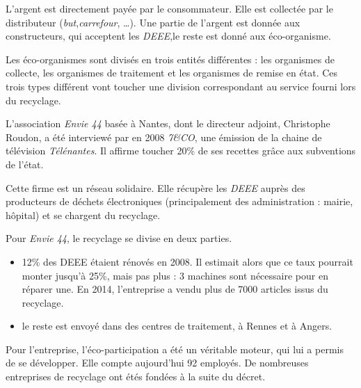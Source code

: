 L'argent est directement payée par le consommateur. Elle est collectée par le distributeur (\textit{but},\textit{carrefour}, \dots). Une partie de l'argent est donnée aux constructeurs, qui acceptent les \textit{DEEE},le reste est donné aux éco-organisme. 

Les éco-organismes sont divisés en trois entités différentes : les organismes de collecte, les organismes de traitement et les organismes de remise en état. Ces trois types différent vont toucher une division correspondant au service fourni lors du recyclage. 

\medbreak

L'association \textit{Envie 44} basée à Nantes, dont le directeur adjoint, Christophe Roudon, a été interviewé par en 2008 \textit{7\&CO}, une émission de la chaine de télévision \textit{Télénantes}. Il affirme toucher 20\% de ses recettes grâce aux subventions de l'état. 

Cette firme est un réseau solidaire. Elle récupère les \textit{DEEE} auprès des producteurs de déchets électroniques (principalement des administration : mairie, hôpital) et se chargent du recyclage. 

Pour \textit{Envie 44}, le recyclage se divise en deux parties. 
\begin{itemize}
\item 12\% des DEEE étaient rénovés en 2008. Il estimait alors que ce taux pourrait monter jusqu'à 25\%, mais pas plus : 3 machines sont nécessaire pour en réparer une. En 2014, l'entreprise a vendu plus de 7000 articles issus du recyclage. 
\item le reste est envoyé dans des centres de traitement, à Rennes et à Angers.
\end{itemize}

Pour l'entreprise, l'éco-participation a été un véritable moteur, qui lui a permis de se développer. Elle compte aujourd'hui 92 employés. De nombreuses entreprises de recyclage ont étés fondées à la suite du décret. 